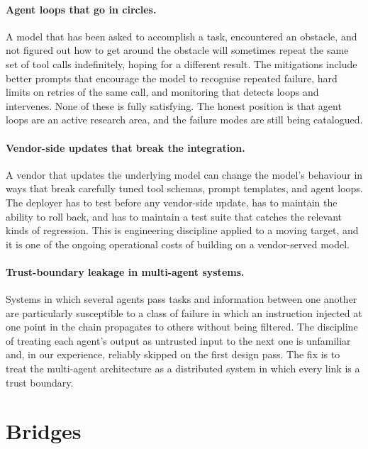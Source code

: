 \paragraph{Agent loops that go in circles.} A model that has
been asked to accomplish a task, encountered an obstacle, and
not figured out how to get around the obstacle will sometimes
repeat the same set of tool calls indefinitely, hoping for a
different result. The mitigations include better prompts that
encourage the model to recognise repeated failure, hard
limits on retries of the same call, and monitoring that
detects loops and intervenes. None of these is fully
satisfying. The honest position is that agent loops are an
active research area, and the failure modes are still being
catalogued.

\paragraph{Vendor-side updates that break the integration.}
A vendor that updates the underlying model can change the
model's behaviour in ways that break carefully tuned tool
schemas, prompt templates, and agent loops. The deployer has
to test before any vendor-side update, has to maintain the
ability to roll back, and has to maintain a test suite that
catches the relevant kinds of regression. This is engineering
discipline applied to a moving target, and it is one of the
ongoing operational costs of building on a vendor-served
model.

\paragraph{Trust-boundary leakage in multi-agent systems.}
Systems in which several agents pass tasks and information
between one another are particularly susceptible to a class
of failure in which an instruction injected at one point in
the chain propagates to others without being filtered. The
discipline of treating each agent's output as untrusted
input to the next one is unfamiliar and, in our experience,
reliably skipped on the first design pass. The fix is to
treat the multi-agent architecture as a distributed system in
which every link is a trust boundary.

\section*{Bridges}

